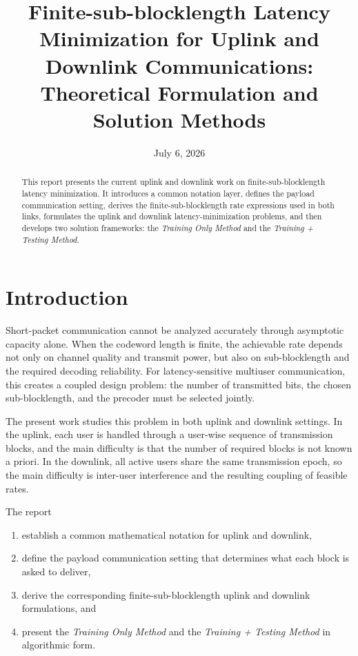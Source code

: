 \documentclass[11pt]{article}
\title{Finite-sub-blocklength Latency Minimization for Uplink and Downlink Communications:\\Theoretical Formulation and Solution Methods}
\author{}
\date{July 6, 2026}
\begin{document}
\maketitle

\begin{abstract}
This report presents the current uplink and downlink
work on finite-sub-blocklength latency minimization. It introduces a common
notation layer, defines the payload communication setting, derives the
finite-sub-blocklength rate expressions used in both links, formulates the uplink
and downlink latency-minimization problems, and then develops two solution
frameworks: the \emph{Training Only Method} and the \emph{Training + Testing
Method}. 
\end{abstract}

\section{Introduction}

Short-packet communication cannot be analyzed accurately through asymptotic
capacity alone. When the codeword length is finite, the achievable rate depends
not only on channel quality and transmit power, but also on sub-blocklength and the
required decoding reliability. For latency-sensitive multiuser communication,
this creates a coupled design problem: the number of transmitted bits, the
chosen sub-blocklength, and the precoder must be selected jointly.

The present work studies this problem in both uplink and downlink settings. In
the uplink, each user is handled through a user-wise sequence of transmission
blocks, and the main difficulty is that the number of required blocks is not
known a priori. In the downlink, all active users share the same transmission
epoch, so the main difficulty is inter-user interference and the resulting
coupling of feasible rates.

The report
\begin{enumerate}
    \item establish a common mathematical notation for uplink and downlink,
    \item define the payload communication setting that determines what each block is asked to deliver,
    \item derive the corresponding finite-sub-blocklength uplink and downlink formulations, and
    \item present the \emph{Training Only Method} and the \emph{Training + Testing Method} in algorithmic form.
\end{enumerate}
\end{document}
